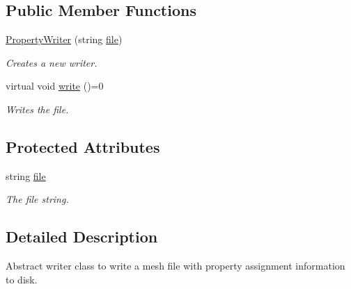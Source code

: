 \subsection*{Public Member Functions}
\begin{DoxyCompactItemize}
\item 
\hyperlink{classmesh_1_1_property_writer_a978874a41f62868cc2b1ba5d16256bdf}{PropertyWriter} (string \hyperlink{classmesh_1_1_property_writer_a296638bd6daba8a6545688bacfc4fef1}{file})
\begin{DoxyCompactList}\small\item\em Creates a new writer. \item\end{DoxyCompactList}\item 
\hypertarget{classmesh_1_1_property_writer_ab95dbcb397acfca04b34f3d677b734e5}{
virtual void \hyperlink{classmesh_1_1_property_writer_ab95dbcb397acfca04b34f3d677b734e5}{write} ()=0}
\label{classmesh_1_1_property_writer_ab95dbcb397acfca04b34f3d677b734e5}

\begin{DoxyCompactList}\small\item\em Writes the file. \item\end{DoxyCompactList}\end{DoxyCompactItemize}
\subsection*{Protected Attributes}
\begin{DoxyCompactItemize}
\item 
\hypertarget{classmesh_1_1_property_writer_a296638bd6daba8a6545688bacfc4fef1}{
string \hyperlink{classmesh_1_1_property_writer_a296638bd6daba8a6545688bacfc4fef1}{file}}
\label{classmesh_1_1_property_writer_a296638bd6daba8a6545688bacfc4fef1}

\begin{DoxyCompactList}\small\item\em The file string. \item\end{DoxyCompactList}\end{DoxyCompactItemize}


\subsection{Detailed Description}
Abstract writer class to write a mesh file with property assignment information to disk. 

